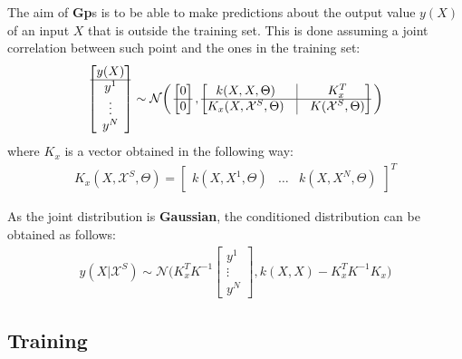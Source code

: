 \documentclass{article}
\begin{document}
The aim of \textbf{Gp}s is to be able to make predictions about the output value $y(X)$ of an input $X$ that is outside the training set. This is done assuming a joint correlation between such point and the ones in the training set: 
\begin{eqnarray}
\begin{bmatrix} y(X) \\ \hline y^1 \\ \vdots \\ y^N \end{bmatrix} \sim \mathcal{N} 
\bigg (
\begin{bmatrix} 0 \\ \hline 0 \end{bmatrix},
\begin{bmatrix}
k(X,X, \Theta) & \vline & K_x^T \\ 
\hline
K_x(X, \mathcal{X}^S, \Theta) & \vline & K(\mathcal{X}^S, \Theta)
\end{bmatrix}
\bigg )
\end{eqnarray}
where $K_x$ is a vector obtained in the following way:
\begin{eqnarray}
K_x(X, \mathcal{X}^S, \Theta) = \begin{bmatrix}
k(X, X^1 , \Theta) & \hdots & k(X, X^N , \Theta)
\end{bmatrix} ^ T
\end{eqnarray}

As the joint distribution is \textbf{Gaussian}, the conditioned distribution can be obtained as follows:
\begin{eqnarray}
y(X | \mathcal{X}^S) \sim \mathcal{N} \bigg ( 
K_x^T K^{-1} \begin{bmatrix} y^1 \\ \vdots \\ y^N \end{bmatrix} , 
k(X,X) - K_x^T K^{-1}K_x
\bigg )
\end{eqnarray}

\subsection{Training}
\label{sec:train_scalar}
\end{document}
